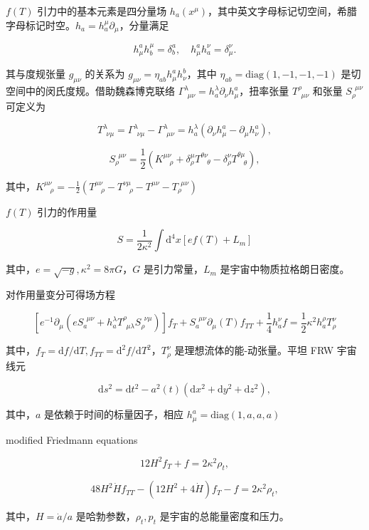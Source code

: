 \documentclass[9pt, dvipsnames]{beamer} %
\begin{document}
\begin{frame}

    $f(T)$ 引力中的基本元素是四分量场 $h_a(x^\mu)$，其中英文字母标记切空间，希腊字母标记时空。$h_a=h_a^\mu\partial_\mu$，分量满足

    $$
    h_\mu^a h_b^\mu = \delta_b^a,\quad h_\mu^a h_a^\nu = \delta_\mu^\nu.
    $$

    其与度规张量 $g_{\mu\nu}$ 的关系为 $ g_{\mu\nu}=\eta_{ab}h_\mu^ah_\nu^b$，其中 $\eta_{ab}=\mathrm{diag}(1,-1,-1,-1)$ 是切空间中的闵氏度规。借助魏森博克联络 $\Gamma_{~~\mu\nu}^{\lambda}=h_a^\lambda \partial_\nu h_\mu^a$，扭率张量 $T^\rho_{~~\mu\nu}$ 和张量 $S_\rho^{~~\mu\nu}$ 可定义为

    $$
    T^{\lambda}_{~~\nu\mu} = \Gamma^\lambda_{~~\nu\mu} - \Gamma^\lambda_{~~\mu\nu} = h_a^\lambda\left(\partial_\nu h_\mu^a - \partial_\mu h_\nu^a \right),
    $$

    $$
    S_\rho^{~~\mu\nu} = \frac{1 }{2 } \left(K^{\mu\nu}_{~~~~\rho} + \delta_\rho^\mu T^{\theta\nu}_{~~~~\theta} - \delta_\rho^\nu T^{\theta\mu}_{~~~~\theta} \right),
    $$

    其中，$K^{\mu\nu}_{~~~~\rho}=-\frac{1}{2}(T^{\mu\nu}_{~~~~\rho}-T^{\nu\mu}_{~~~~\rho}-T^{\mu\nu}-T_\rho^{~~\mu\nu}) $

    $f(T)$ 引力的作用量

    $$
    S = \frac{1}{2\kappa^2}\int \mathrm{d}^4 x [ef(T)+L_m]
    $$

    其中，$e=\sqrt{-g},\kappa^2=8\pi G$，$G$ 是引力常量，$L_m$ 是宇宙中物质拉格朗日密度。
    
\end{frame}

\begin{frame}
    对作用量变分可得场方程

    $$
    \left[e^{-1}\partial_\mu \left(e S_a^{~~\mu\nu} + h_a^\lambda T^\rho_{~~\mu\lambda} S_\rho^{~~\nu\mu} \right) \right] f_T + S_a^{~~\mu\nu} \partial_\mu(T) f_{TT} + \frac{1 }{4 } h_a^\nu f
    =\frac{1 }{2 } \kappa^2 h_a^\rho T_\rho^\nu
    $$
    
    其中，$f_T=\mathrm{d}f/\mathrm{d}T,f_{TT}=\mathrm{d}^2f/\mathrm{d}T^2$，$T_\rho^\nu$ 是理想流体的能-动张量。平坦 FRW 宇宙线元

    $$
    \mathrm{d}s^2
    =\mathrm{d}t^2 - a^2(t)\left(\mathrm{d}x^2+\mathrm{d}y^2+\mathrm{d}z^2 \right),
    $$

    其中，$a$ 是依赖于时间的标量因子，相应 $h_\mu^a=\mathrm{diag}(1,a,a,a)$

    modified Friedmann equations

    $$
    12 H^2 f_T + f = 2\kappa^2 \rho_t,
    $$

    $$
    48H^2\dot{H} f_{TT} - \left(12 H^2 + 4\dot{H} \right) f_T - f= 2\kappa^2 \rho_t,
    $$

    其中，$H=\dot{a}/a$ 是哈勃参数，$\rho_t,p_t$ 是宇宙的总能量密度和压力。
\end{frame}
\end{document}

